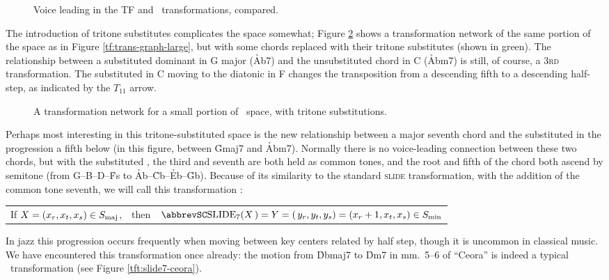\begin{figure}[htbp]
  \caption{Voice leading in the TF and \tft\ transformations, compared.}
  \label{tft:voice-leading-tft}
\end{figure}

The introduction of tritone substitutes complicates the space somewhat; Figure
\ref{tft:tft-space-extract} shows a transformation network of the same portion
of the space as in Figure \ref{tf:trans-graph-large}, but with some chords
replaced with their tritone substitutes (shown in green). The relationship
between a substituted dominant in G major (\h{Ab7}) and the unsubstituted \ii
chord in C (\h{Abm7}) is still, of course, a \textsc{3rd} transformation. The
substituted \V in C moving to the diatonic \V in F changes the
transposition from a descending fifth to a descending half-step, as indicated
by the $T_{11}$ arrow.

\begin{figure}[tbp]
  \caption{A transformation network for a small portion of \tf\ space, with
    tritone substitutions.}
  \label{tft:tft-space-extract}
\end{figure}

Perhaps most interesting in this tritone-substituted space is the new
relationship between a major seventh chord and the substituted \ii in
the progression a fifth below (in this figure, between \h{Gmaj7} and \h{Abm7}).
Normally there is no voice-leading connection between these two chords, but
with the substituted \ii, the third and seventh are both held as common
tones, and the root and fifth of the chord both ascend by semitone (from
G--B--D--\h{Fs} to \h{Ab}--\h{Cb}--\h{Eb}--\h{Gb}). Because of its
similarity to the standard \textsc{slide} transformation, with the addition of
the common tone seventh, we will call this transformation \slideS: \\
%
\vspace{0.5\baselineskip}
\begin{tabular}{lcl}
  If $X = (x_r, x_t, x_s) \in S_{\mathrm{maj}}$, & then &
    $\text{\slideS}(X\,) = Y = (\,y_r, y_t, y_s) = (x_r +1, x_t, x_s) \in \Smin$
\end{tabular}
\vspace{0.5\baselineskip}

\noindent In jazz this progression occurs frequently when moving between key
centers related by half step, though it is uncommon in classical
music. We have encountered this transformation once already: the
motion from \h{Dbmaj7} to \h{Dm7} in mm.~5--6 of ``Ceora'' is indeed a typical
\slideS\ transformation (see Figure \ref{tft:slide7-ceora}).

